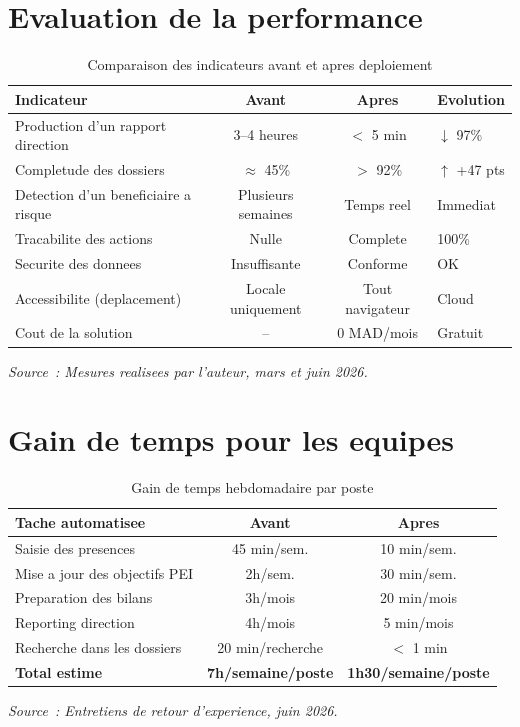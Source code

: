 \documentclass[12pt,a4paper,openany]{report}
\begin{document}
\section{Evaluation de la performance}

\begin{table}[H]
\centering
\caption{Comparaison des indicateurs avant et apres deploiement}
\label{tab:impact}
\begin{tabularx}{\textwidth}{Xccl}
\toprule
\textbf{Indicateur} & \textbf{Avant} & \textbf{Apres} & \textbf{Evolution}\\
\midrule
Production d'un rapport direction & 3--4 heures & $<$ 5 min & \textcolor{vertOK}{$\downarrow$ 97\%}\\
Completude des dossiers & $\approx$ 45\% & $>$ 92\% & \textcolor{vertOK}{$\uparrow$ +47 pts}\\
Detection d'un beneficiaire a risque & Plusieurs semaines & Temps reel & \textcolor{vertOK}{Immediat}\\
Tracabilite des actions & Nulle & Complete & \textcolor{vertOK}{100\%}\\
Securite des donnees & Insuffisante & Conforme & \textcolor{vertOK}{OK}\\
Accessibilite (deplacement) & Locale uniquement & Tout navigateur & \textcolor{vertOK}{Cloud}\\
Cout de la solution & -- & 0 MAD/mois & \textcolor{vertOK}{Gratuit}\\
\bottomrule
\end{tabularx}
\vspace{0.1cm}
\small\textit{Source~: Mesures realisees par l'auteur, mars et juin 2026.}
\end{table}

\section{Gain de temps pour les equipes}

\begin{table}[H]
\centering
\caption{Gain de temps hebdomadaire par poste}
\label{tab:temps}
\begin{tabularx}{\textwidth}{Xcc}
\toprule
\textbf{Tache automatisee} & \textbf{Avant} & \textbf{Apres}\\
\midrule
Saisie des presences & 45 min/sem. & 10 min/sem.\\
Mise a jour des objectifs PEI & 2h/sem. & 30 min/sem.\\
Preparation des bilans & 3h/mois & 20 min/mois\\
Reporting direction & 4h/mois & 5 min/mois\\
Recherche dans les dossiers & 20 min/recherche & $<$ 1 min\\
\midrule
\textbf{Total estime} & \textbf{7h/semaine/poste} & \textbf{1h30/semaine/poste}\\
\bottomrule
\end{tabularx}
\vspace{0.1cm}
\small\textit{Source~: Entretiens de retour d'experience, juin 2026.}
\end{table}
\end{document}

